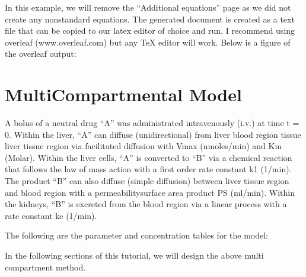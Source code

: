 \documentclass[letterpaper,10pt,english]{sphinxmanual}
\begin{document}
\sphinxAtStartPar
In this example, we will remove the “Additional equations” page as we did not
create any non\sphinxhyphen{}standard equations. The generated document is created as a text
file that can be copied to our latex editor of choice and run.  I recommend
using overleaf (www.overleaf.com) but any TeX editor will work.
Below is a figure of the overleaf output:

\begin{figure}[htbp]
\centering

\noindent{}
\end{figure}


\chapter{Multi\sphinxhyphen{}Compartmental Model}
\label{\detokenize{pages/tutorial_mc_index:multi-compartmental-model}}\label{\detokenize{pages/tutorial_mc_index::doc}}
\sphinxAtStartPar
A bolus of a neutral drug “A” was administrated intravenously (i.v.) at time
t = 0. Within the liver, “A” can diffuse (unidirectional) from liver blood
region tissue liver tissue region via facilitated diffusion with Vmax
(nmoles/min) and Km (Molar). Within the liver cells, “A” is converted to
“B” via a chemical reaction that follows the law of mass action with a first
order rate constant k1 (1/min). The product “B” can also diffuse
(simple diffusion) between liver tissue region and blood region with a
permeability\sphinxhyphen{}surface area product PS (ml/min). Within the kidneys, “B” is
excreted from the blood region via a linear process with a rate constant ke
(1/min).

\begin{figure}[htbp]
\centering

\noindent{}
\end{figure}

\sphinxAtStartPar
The following are the parameter and concentration tables for the model:

\begin{figure}[htbp]
\centering

\noindent{}
\end{figure}

\sphinxAtStartPar
In the following sections of this tutorial, we will design the above
multi compartment method.
\end{document}
